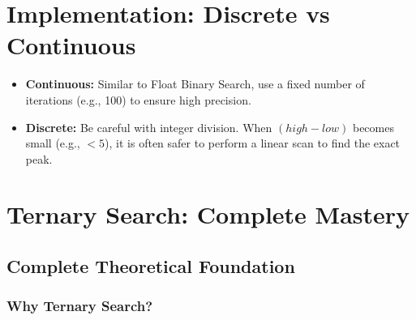 \documentclass[11pt,a4paper,oneside]{book}
\begin{document}
\section{Implementation: Discrete vs Continuous}
\begin{itemize}
    \item \textbf{Continuous:} Similar to Float Binary Search, use a fixed number of iterations (e.g., 100) to ensure high precision.
    \item \textbf{Discrete:} Be careful with integer division. When $(high - low)$ becomes small (e.g., $< 5$), it is often safer to perform a linear scan to find the exact peak.
\end{itemize}

\section{Ternary Search: Complete Mastery}

\subsection{Complete Theoretical Foundation}

\subsubsection{Why Ternary Search?}
\end{document}
